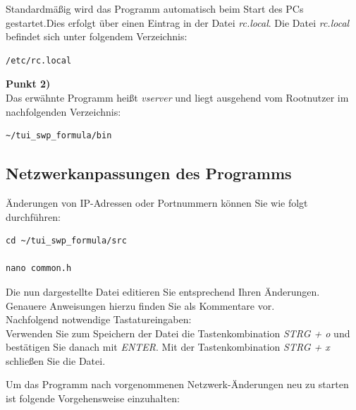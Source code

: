 \documentclass[fontsize = 12pt, paper = a4]{scrreprt}
\begin{document}
Standardmäßig wird das Programm automatisch beim Start des PCs gestartet.Dies erfolgt über einen Eintrag in der Datei \textit{rc.local}.
Die Datei \textit{rc.local} befindet sich unter folgendem Verzeichnis:

\vspace*{4mm}
\begin{lstlisting}[frame=single]
/etc/rc.local
\end{lstlisting} 
\vspace*{-2mm}

\textbf{Punkt 2)} \\

Das erwähnte Programm heißt \textit{vserver} und liegt ausgehend vom Rootnutzer im nachfolgenden Verzeichnis:

\vspace*{4mm}
\begin{lstlisting}[frame=single]
~/tui_swp_formula/bin
\end{lstlisting} 
\vspace*{-2mm}

\subsection{Netzwerkanpassungen des Programms}


Änderungen von IP-Adressen oder Portnummern können Sie wie folgt durchführen:

\vspace*{4mm}
\begin{lstlisting}[frame=single]
cd ~/tui_swp_formula/src

nano common.h
\end{lstlisting} 
\vspace*{-2mm}

Die nun dargestellte Datei editieren Sie entsprechend Ihren Änderungen. Genauere Anweisungen hierzu finden Sie als Kommentare vor.\\

Nachfolgend notwendige Tastatureingaben: \\

Verwenden Sie zum Speichern der Datei die Tastenkombination \textit{STRG + o} und bestätigen Sie danach mit \textit{ENTER}. Mit der Tastenkombination \textit{STRG + x} schließen Sie die Datei. 

Um das Programm nach vorgenommenen Netzwerk-Änderungen neu zu starten ist folgende Vorgehensweise einzuhalten:
\end{document}
